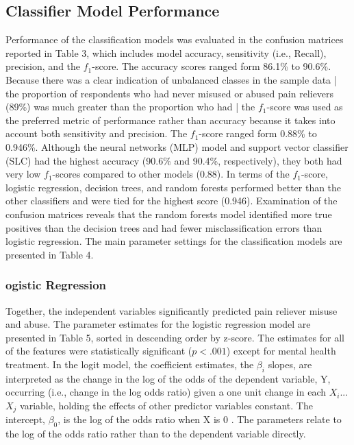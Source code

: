 \documentclass[sigconf]{acmart}
\begin{document}

\subsection{Classifier Model Performance}

Performance of the classification models was evaluated in the confusion 
matrices reported in Table 3, which includes model accuracy, sensitivity 
(i.e., Recall), precision, and the $f_1$-score. The accuracy scores
ranged form 86.1\% to 90.6\%. Because there was a clear indication of 
unbalanced classes in the sample data | the proportion of respondents who 
had never misused or abused pain relievers (89\%) was much greater than 
the proportion who had | the $f_1$-score was used as the preferred metric 
of performance rather than accuracy because it takes into account both 
sensitivity and precision. The $f_1$-score ranged form 0.88\% to 0.946\%.
Although the neural networks (MLP) model and support vector classifier 
(SLC) had the highest accuracy (90.6\% and 90.4\%, respectively), they 
both had very low $f_1$-scores compared to other models (0.88). In terms 
of the $f_1$-score, logistic regression, decision trees, and random forests 
performed better than the other classifiers and were tied for the highest 
score (0.946). Examination of the confusion matrices reveals that the 
random forests model identified more true positives than the decision 
trees and had fewer misclassification errors than logistic regression. 
The main parameter settings for the classification models are presented 
in Table 4.


\subsubsection{ogistic Regression}

Together, the independent variables significantly predicted pain reliever 
misuse and abuse. The parameter estimates for the logistic regression model 
are presented in Table 5, sorted in descending order by z-score. The estimates 
for all of the features were statistically significant ($p<.001$) except for 
mental health treatment. In the logit model, the coefficient estimates, 
the $\beta_i$ slopes, are interpreted as the change in the log of the odds 
of the dependent variable, Y, occurring (i.e., change in the log odds ratio) 
given a one unit change in each $X_i$...$X_j$ variable, holding the effects 
of other predictor variables constant. The intercept, $\beta_0$, is the 
log of the odds ratio when X is 0 \cite{gujarati09}. The parameters relate to 
the log of the odds ratio rather than to the dependent variable directly. 
\end{document}
